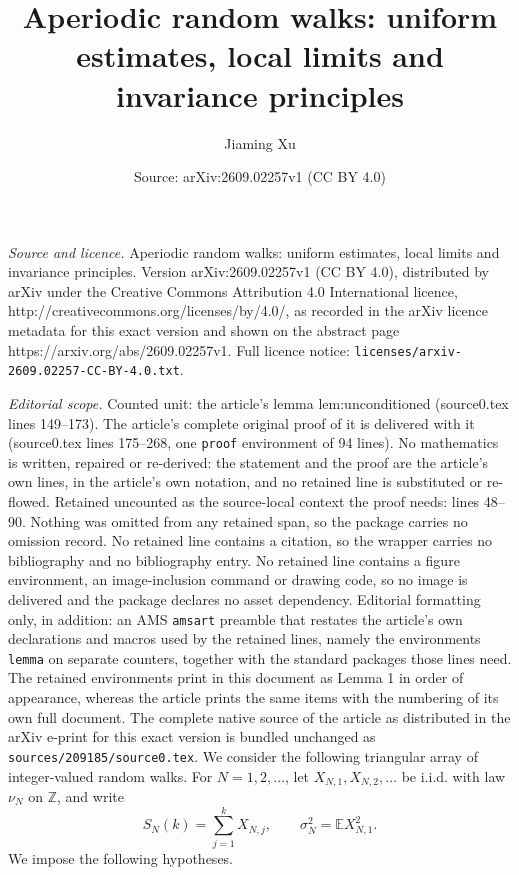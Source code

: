 \documentclass[10pt,a4paper]{amsart}
\title{Aperiodic random walks: uniform estimates, local limits and invariance principles}
\author{Jiaming Xu}
\date{Source: arXiv:2609.02257v1 (CC BY 4.0)}
\newcommand{\Ee}{\mathbb E}
\newcommand{\Z}{\mathbb Z}
\begin{document}
\maketitle

\noindent\emph{Source and licence.} Aperiodic random walks: uniform estimates, local limits and invariance principles. Version arXiv:2609.02257v1 (CC BY 4.0), distributed by arXiv under the Creative Commons Attribution 4.0 International licence, http://creativecommons.org/licenses/by/4.0/, as recorded in the arXiv licence metadata for this exact version and shown on the abstract page https://arxiv.org/abs/2609.02257v1. Full licence notice: \texttt{licenses/arxiv-2609.02257-CC-BY-4.0.txt}.\par\smallskip

\noindent\textit{Editorial scope.} Counted unit: the article's lemma lem:unconditioned (source0.tex lines 149--173). The article's complete original proof of it is delivered with it (source0.tex lines 175--268, one \texttt{proof} environment of 94 lines). No mathematics is written, repaired or re-derived: the statement and the proof are the article's own lines, in the article's own notation, and no retained line is substituted or re-flowed.  Retained uncounted as the source-local context the proof needs: lines 48--90.  Nothing was omitted from any retained span, so the package carries no omission record.  No retained line contains a citation, so the wrapper carries no bibliography and no bibliography entry.  No retained line contains a figure environment, an image-inclusion command or drawing code, so no image is delivered and the package declares no asset dependency.  Editorial formatting only, in addition: an AMS \texttt{amsart} preamble that restates the article's own declarations and macros used by the retained lines, namely the environments \texttt{lemma} on separate counters, together with the standard packages those lines need.  The retained environments print in this document as Lemma 1 in order of appearance, whereas the article prints the same items with the numbering of its own full document.  The complete native source of the article as distributed in the arXiv e-print for this exact version is bundled unchanged as \texttt{sources/209185/source0.tex}.
We consider the following triangular array of integer-valued random
walks. For \(N=1,2,\ldots\), let \(X_{N,1},X_{N,2},\ldots\) be i.i.d. with
law \(\nu_N\) on \(\Z\), and write
\[
 S_N(k)=\sum_{j=1}^k X_{N,j},\qquad
 \sigma_N^2=\Ee X_{N,1}^2 .
\]
We impose the following hypotheses.
\end{document}
